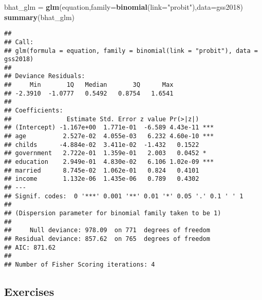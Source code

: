 \documentclass[
]{article}
\newenvironment{Shaded}{\begin{snugshade}}{\end{snugshade}}
\newcommand{\DataTypeTok}[1]{\textcolor[rgb]{0.13,0.29,0.53}{#1}}
\newcommand{\KeywordTok}[1]{\textcolor[rgb]{0.13,0.29,0.53}{\textbf{#1}}}
\newcommand{\NormalTok}[1]{#1}
\newcommand{\StringTok}[1]{\textcolor[rgb]{0.31,0.60,0.02}{#1}}
\begin{document}
\begin{Shaded}
\begin{Highlighting}[]
\NormalTok{bhat_glm =}\StringTok{ }\KeywordTok{glm}\NormalTok{(equation,}\DataTypeTok{family=}\KeywordTok{binomial}\NormalTok{(}\DataTypeTok{link=}\StringTok{"probit"}\NormalTok{),}\DataTypeTok{data=}\NormalTok{gss2018)}
\KeywordTok{summary}\NormalTok{(bhat_glm)}
\end{Highlighting}
\end{Shaded}

\begin{verbatim}
## 
## Call:
## glm(formula = equation, family = binomial(link = "probit"), data = gss2018)
## 
## Deviance Residuals: 
##     Min       1Q   Median       3Q      Max  
## -2.3910  -1.0777   0.5492   0.8754   1.6541  
## 
## Coefficients:
##               Estimate Std. Error z value Pr(>|z|)    
## (Intercept) -1.167e+00  1.771e-01  -6.589 4.43e-11 ***
## age          2.527e-02  4.055e-03   6.232 4.60e-10 ***
## childs      -4.884e-02  3.411e-02  -1.432   0.1522    
## government   2.722e-01  1.359e-01   2.003   0.0452 *  
## education    2.949e-01  4.830e-02   6.106 1.02e-09 ***
## married      8.745e-02  1.062e-01   0.824   0.4101    
## income       1.132e-06  1.435e-06   0.789   0.4302    
## ---
## Signif. codes:  0 '***' 0.001 '**' 0.01 '*' 0.05 '.' 0.1 ' ' 1
## 
## (Dispersion parameter for binomial family taken to be 1)
## 
##     Null deviance: 978.09  on 771  degrees of freedom
## Residual deviance: 857.62  on 765  degrees of freedom
## AIC: 871.62
## 
## Number of Fisher Scoring iterations: 4
\end{verbatim}

\hypertarget{exercises-2}{%
\subsection{Exercises}\label{exercises-2}}
\end{document}
